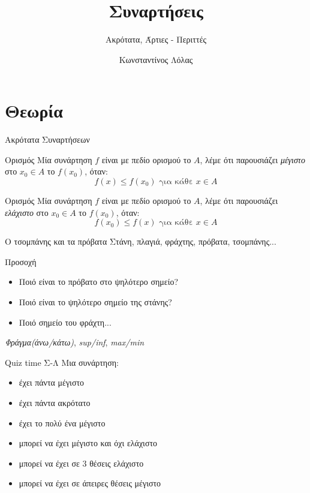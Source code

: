 \documentclass{presentation}
\title{Συναρτήσεις}
\subtitle{Ακρότατα, Άρτιες - Περιττές}
\author[Λόλας]{Κωνσταντίνος Λόλας}
\begin{document}
\begin{frame}
  \titlepage
\end{frame}

\section{Θεωρία}
\begin{frame}{Ακρότατα Συναρτήσεων}
  \begin{block}{Ορισμός}
    Μία συνάρτηση $f$ είναι με πεδίο ορισμού το $Α$, λέμε ότι παρουσιάζει \emph{μέγιστο} στο $x_0\in Α$ το $f(x_0)$, όταν:
    $$f(x)\le f(x_0)\text{ για κάθε } x\in Α$$
  \end{block} \pause
  \begin{block}{Ορισμός}
    Μία συνάρτηση $f$ είναι με πεδίο ορισμού το $Α$, λέμε ότι παρουσιάζει \emph{ελάχιστο} στο $x_0\in Α$ το $f(x_0)$, όταν:
    $$f(x_0)\le f(x)\text{ για κάθε } x\in Α$$
  \end{block}
\end{frame}

\begin{frame}{Ο τσομπάνης και τα πρόβατα}
  Στάνη, πλαγιά, φράχτης, πρόβατα, τσομπάνης... \pause
  \begin{alertblock}{Προσοχή}
    \begin{itemize}
      \item Ποιό είναι το πρόβατο στο ψηλότερο σημείο?
      \item Ποιό είναι το ψηλότερο σημείο της στάνης?
      \item Ποιό σημείο του φράχτη...
    \end{itemize}
  \end{alertblock}
  \emph{Φράγμα(άνω/κάτω)}, \emph{sup/inf}, \emph{max/min}
\end{frame}

\begin{frame}{Quiz time Σ-Λ}
  Μια συνάρτηση:
  \begin{itemize}
    \item έχει πάντα μέγιστο\pause
    \item έχει πάντα ακρότατο\pause
    \item έχει το πολύ ένα μέγιστο\pause
    \item μπορεί να έχει μέγιστο και όχι ελάχιστο \pause
    \item μπορεί να έχει σε 3 θέσεις ελάχιστο \pause
    \item μπορεί να έχει σε άπειρες θέσεις μέγιστο
  \end{itemize}
\end{frame}
\end{document}
